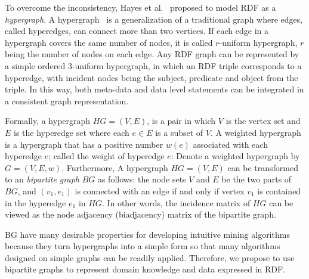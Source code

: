 To overcome the inconsistency, Hayes et al.~\cite{GraphModelRDF} proposed to model RDF as a \emph{hypergraph}. A hypergraph~\cite{Hypergraph} is a generalization of a traditional graph where edges, called hyperedges, can connect more than two vertices. If each edge in a hypergraph covers the same number of nodes, it is called $r$-uniform hypergraph, $r$ being the number of nodes on each edge. Any RDF graph can be represented by a simple ordered 3-uniform hypergraph, in which an RDF triple corresponds to a hyperedge, with incident nodes being the subject, predicate and object from the triple. In this way, both meta-data and data level statements can be integrated in a consistent graph representation.

Formally, a hypergraph $HG = (V,E)$, is a pair in which $V$ is the vertex set and $E$ is the hyperedge set where each $e \in E$ is a subset of $V$. A weighted hypergraph is a hypergraph that has a positive number $w(e)$ associated with each hyperedge $e$; called the weight of hyperedge $e$: Denote a weighted hypergraph by $G = (V,E,w)$. Furthermore, A hypergraph $HG = (V, E)$ can be transformed to an \emph{bipartite graph} $BG$ as follows: the node sets $V$ and $E$ be the two parts of $BG$, and $(v_1, e_1)$ is connected with an edge if and only if vertex $v_1$ is contained in the hyperedge $e_1$ in $HG$. In other words, the incidence matrix of $HG$ can be viewed as the node adjacency (biadjacency) matrix of the bipartite graph.

BG have many desirable properties for developing intuitive mining algorithms because they turn hypergraphs into a simple form so that many algorithms designed on simple graphs can be readily applied. Therefore, we propose to use bipartite graphs to represent domain knowledge and data expressed in RDF.

